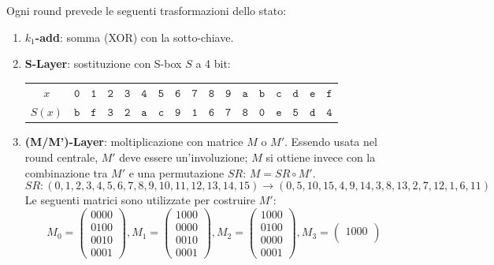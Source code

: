 \documentclass[target=bach,aauheader=,style=]{thud}
\begin{document}
			Ogni round prevede le seguenti trasformazioni dello stato:
			\begin{enumerate}
				\item \textbf{$k_1$-add}: somma (XOR) con la sotto-chiave.
				\item \textbf{S-Layer}: sostituzione con S-box $S$ a 4 bit:
				\begin{center}
					\begin{tabular}{|c|cccccccccccccccc|}
						\hline
						$x$ & $\mathtt{0}$ & $\mathtt{1}$ & $\mathtt{2}$ & $\mathtt{3}$ & $\mathtt{4}$ & $\mathtt{5}$ & $\mathtt{6}$ & $\mathtt{7}$ & $\mathtt{8}$ & $\mathtt{9}$ & $\mathtt{a}$ & $\mathtt{b}$ & $\mathtt{c}$ & $\mathtt{d}$ & $\mathtt{e}$ & $\mathtt{f}$\\
						$S(x)$ & $\mathtt{b}$ & $\mathtt{f}$ & $\mathtt{3}$ & $\mathtt{2}$ & $\mathtt{a}$ & $\mathtt{c}$ & $\mathtt{9}$ & $\mathtt{1}$ & $\mathtt{6}$ & $\mathtt{7}$ & $\mathtt{8}$ & $\mathtt{0}$ & $\mathtt{e}$ & $\mathtt{5}$ & $\mathtt{d}$ & $\mathtt{4}$\\
						\hline
					\end{tabular}
				\end{center}
				\item \textbf{(M/M')-Layer}: moltiplicazione con matrice $M$ o $M'$. Essendo usata nel round centrale, $M'$ deve essere un'involuzione; $M$ si ottiene invece con la combinazione tra $M'$ e una permutazione $SR$: $M = SR \circ M' $.
				\[SR:(0,1,2,3,4,5,6,7,8,9,10,11,12,13,14,15) \rightarrow (0,5,10,15,4,9,14,3,8,13,2,7,12,1,6,11) \]
				Le seguenti matrici sono utilizzate per costruire $M'$:
				\[M_0 = 
				\begin{pmatrix}
					0000\\
					0100\\
					0010\\
					0001
				\end{pmatrix},
				M_1 =
				\begin{pmatrix}
					1000\\
					0000\\
					0010\\
					0001
				\end{pmatrix},
				M_2 =
				\begin{pmatrix}
					1000\\
					0100\\
					0000\\
					0001
				\end{pmatrix},
				M_3 =
				\begin{pmatrix}
					1000\\

\end{pmatrix}\]
\end{enumerate}
\end{document}
